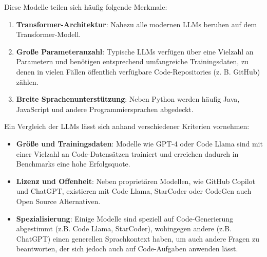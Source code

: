 \documentclass[11pt,a4paper]{article}
\begin{document}
Diese Modelle teilen sich häufig folgende Merkmale:
\begin{enumerate}
    \item \textbf{Transformer-Architektur}: Nahezu alle modernen LLMs beruhen auf dem Transformer-Modell.
    \item \textbf{Große Parameteranzahl}: Typische LLMs verfügen über eine Vielzahl an Parametern und benötigen entsprechend umfangreiche Trainingsdaten, zu denen in vielen Fällen öffentlich verfügbare Code-Repositories (z. B. GitHub) zählen\cite{chen2021evaluatinglargelanguagemodels}.
    \item \textbf{Breite Sprachenunterstützung}: Neben Python werden häufig Java, JavaScript und andere Programmiersprachen abgedeckt\cite{chen2021evaluatinglargelanguagemodels,jiang2024surveylargelanguagemodels}.
\end{enumerate}
Ein Vergleich der LLMs lässt sich anhand verschiedener Kriterien vornehmen:
\begin{itemize}
    \item \textbf{Größe und Trainingsdaten}: Modelle wie GPT-4 oder Code Llama sind mit einer Vielzahl an Code-Datensätzen trainiert und erreichen dadurch in Benchmarks eine hohe Erfolgsquote\cite{NEURIPS2023_43e9d647}.
    \item \textbf{Lizenz und Offenheit}: Neben proprietären Modellen, wie GitHub Copilot und ChatGPT, existieren mit Code Llama, StarCoder\cite{li2023starcodersourceyou} oder CodeGen\cite{nijkamp2023codegenopenlargelanguage} auch Open Source Alternativen.
    \item \textbf{Spezialisierung}: Einige Modelle sind speziell auf Code-Generierung abgestimmt (z.B. Code Llama, StarCoder\cite{li2023starcodersourceyou}), wohingegen andere (z.B. ChatGPT) einen generellen Sprachkontext haben, um auch andere Fragen zu beantworten, der sich jedoch auch auf Code-Aufgaben anwenden lässt.
\end{itemize}
\end{document}
